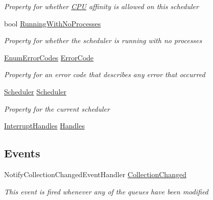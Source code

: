 \begin{DoxyCompactItemize}
\begin{DoxyCompactList}\small\item\em Property for whether \hyperlink{namespace_c_p_u___o_s___simulator_1_1_c_p_u}{C\+P\+U} affinity is allowed on this scheduler \end{DoxyCompactList}\item 
bool \hyperlink{class_c_p_u___o_s___simulator_1_1_operating___system_1_1_o_s_core_a1f01594c8f33961b5dc5ffffaf7644ce}{Running\+With\+No\+Processes}
\begin{DoxyCompactList}\small\item\em Property for whether the scheduler is running with no processes \end{DoxyCompactList}\item 
\hyperlink{namespace_c_p_u___o_s___simulator_1_1_operating___system_aea0b669d1bbf5690ae34ac2f8bef9470}{Enum\+Error\+Codes} \hyperlink{class_c_p_u___o_s___simulator_1_1_operating___system_1_1_o_s_core_a77a647e293c14574919b144cb2e8998f}{Error\+Code}
\begin{DoxyCompactList}\small\item\em Property for an error code that describes any error that occurred \end{DoxyCompactList}\item 
\hyperlink{class_c_p_u___o_s___simulator_1_1_operating___system_1_1_scheduler}{Scheduler} \hyperlink{class_c_p_u___o_s___simulator_1_1_operating___system_1_1_o_s_core_aa97bbf90ba03bd17c02f889189108455}{Scheduler}
\begin{DoxyCompactList}\small\item\em Property for the current scheduler \end{DoxyCompactList}\item 
\hyperlink{class_c_p_u___o_s___simulator_1_1_c_p_u_1_1_interrupts_1_1_interrupt_handles}{Interrupt\+Handles} \hyperlink{class_c_p_u___o_s___simulator_1_1_operating___system_1_1_o_s_core_a964f5a60cfd9d51fa045a12d0f673911}{Handles}
\end{DoxyCompactItemize}
\subsection*{Events}
\begin{DoxyCompactItemize}
\item 
Notify\+Collection\+Changed\+Event\+Handler \hyperlink{class_c_p_u___o_s___simulator_1_1_operating___system_1_1_o_s_core_abcbb2efff8a4078fae3edb9b31f62198}{Collection\+Changed}
\begin{DoxyCompactList}\small\item\em This event is fired whenever any of the queues have been modified \end{DoxyCompactList}\end{DoxyCompactItemize}
